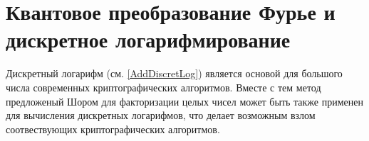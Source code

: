 \section{Квантовое преобразование Фурье и дискретное логарифмирование}
Дискретный логарифм (см. \autoref{AddDiscretLog}) является основой для
большого числа современных криптографических алгоритмов. Вместе с тем
метод предложеный Шором для факторизации целых чисел может быть также
применен для вычисления дискретных логарифмов, что делает возможным
взлом соотвествующих криптографических алгоритмов.



